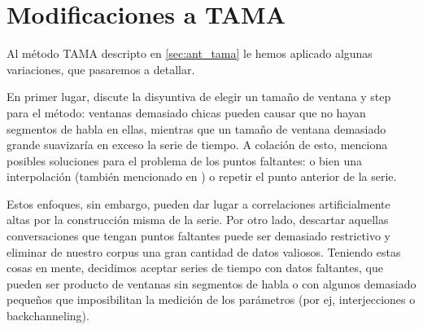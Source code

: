 \section{Modificaciones a TAMA}
\label{sec:tama_modifications}
Al método TAMA descripto en \ref{sec:ant_tama} le hemos aplicado algunas variaciones, que pasaremos a detallar.

En primer lugar, \cite{KOU2008.2} discute la disyuntiva de elegir un tamaño de ventana y step para el método: ventanas demasiado chicas pueden causar que no hayan segmentos de habla en ellas, mientras que un tamaño de ventana demasiado grande suavizaría en exceso la serie de tiempo. A colación de esto, menciona posibles soluciones para el problema de los puntos faltantes: o bien una interpolación (también mencionado en \cite{DEL2013}) o repetir el punto anterior de la serie.

Estos enfoques, sin embargo, pueden dar lugar a correlaciones artificialmente altas por la construcción misma de la serie. Por otro lado, descartar aquellas conversaciones que tengan puntos faltantes puede ser demasiado restrictivo y eliminar de nuestro corpus una gran cantidad de datos valiosos. Teniendo estas cosas en mente, decidimos aceptar series de tiempo con datos faltantes, que pueden ser producto de ventanas sin segmentos de habla o con algunos demasiado pequeños que imposibilitan la medición de los parámetros (por ej, interjecciones o backchanneling).



